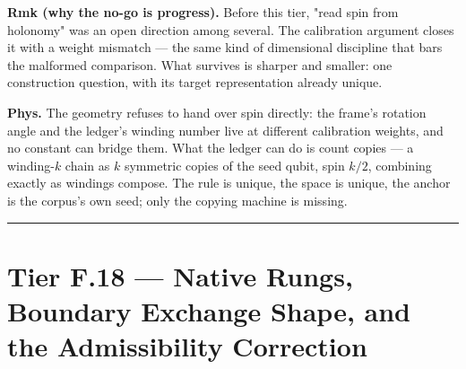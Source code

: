 \begin{theorem}
\textbf{Rmk (why the no-go is progress).} Before this tier, "read spin from holonomy" was an open direction among several. The calibration argument closes it with a weight mismatch — the same kind of dimensional discipline that bars the malformed comparison. What survives is sharper and smaller: one construction question, with its target representation already unique.

\textbf{Phys.} The geometry refuses to hand over spin directly: the frame's rotation angle and the ledger's winding number live at different calibration weights, and no constant can bridge them. What the ledger can do is count copies — a winding-$k$ chain as $k$ symmetric copies of the seed qubit, spin $k/2$, combining exactly as windings compose. The rule is unique, the space is unique, the anchor is the corpus's own seed; only the copying machine is missing.

\vspace{2pt}\noindent\rule{\textwidth}{0.4pt}\vspace{2pt}

\end{theorem}

\section[Tier F.18 — Native Rungs, Boundary Exchange Shape, and the…]{\texorpdfstring{Tier F.18 — Native Rungs, Boundary Exchange Shape, and the Admissibility Correction}{Tier F.18 - Native Rungs, Boundary Exchange Shape, and the Admissibility Correction}}

